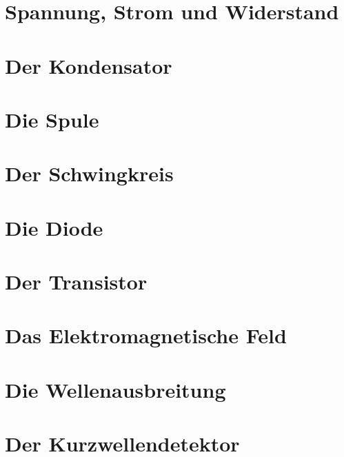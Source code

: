 \documentclass[ngerman,openany, twoside]{Script}
\begin{document}


\newpage

\chapter{Spannung, Strom und Widerstand}


\chapter{Der Kondensator}


\chapter{Die Spule}


\chapter{Der Schwingkreis}


\chapter{Die Diode}


\chapter{Der Transistor}


\newpage \vspace*{5cm}
\newpage

\chapter{Das Elektromagnetische Feld}


\newpage \vspace*{5cm}
\newpage

\chapter{Die Wellenausbreitung}


\chapter{Der Kurzwellendetektor}

\end{document}
